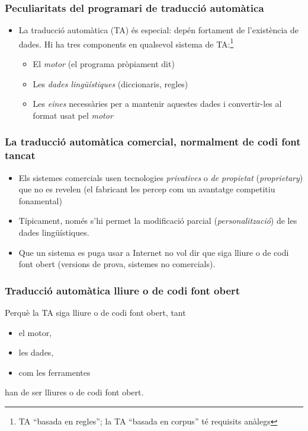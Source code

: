 \documentclass{beamer}
\newcommand{\empha}[1]{\emph{#1}\/}
\begin{document}
\begin{frame}
\frametitle{Peculiaritats del programari de traducció automàtica}
\begin{itemize}
\item La traducció automàtica (TA) és especial: depén fortament de l'existència de dades. Hi ha tres components en qualsevol sistema de TA:\footnote{TA ``basada en regles''; la TA ``basada en corpus'' té requisits anàlegs}
  \begin{itemize} 
  \item El \empha{motor} (el programa pròpiament dit)
  \item Les \empha{dades lingüístiques} (diccionaris, regles)
  \item Les \empha{eines} necessàries per a mantenir aquestes dades i convertir-les al format usat pel \empha{motor}
  \end{itemize}
\end{itemize}


\end{frame}

\begin{frame}
\frametitle{La traducció automàtica comercial, normalment de codi font tancat}
  \begin{itemize}
  \item Els sistemes comercials usen tecnologies \empha{privatives} o
    \empha{de propietat} (\empha{proprietary}) que no es revelen (el fabricant
    les percep com un avantatge competitiu fonamental)
  \item Típicament, només s'hi permet la modificació parcial (\empha{personalització}) de les dades lingüístiques.
  \item Que un sistema es puga usar a Internet no vol dir que siga lliure o de codi font obert (versions de prova, sistemes no comercials).
  \end{itemize}
\end{frame}

\begin{frame}
\frametitle{Traducció automàtica lliure o de codi font obert}
Perquè la TA siga lliure o de codi font obert, tant   
\begin{itemize}
\item el motor, 
\item les dades, 
\item com les ferramentes 
\end{itemize}
han de ser lliures o de codi font obert.
\end{frame}
\end{document}
